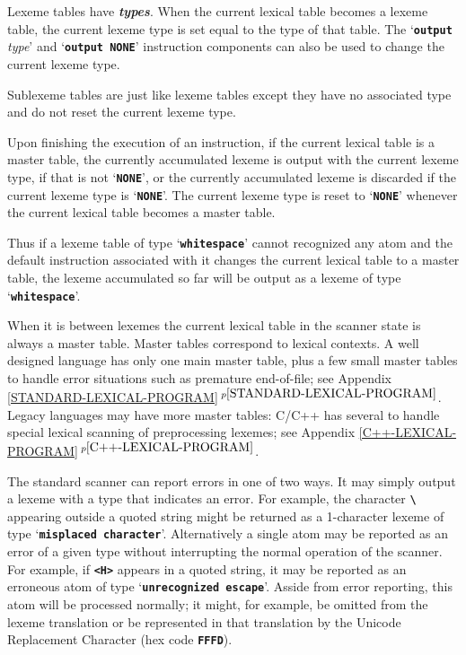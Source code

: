 \documentclass[12pt]{article}
\newcommand{\TT}[1]{{\tt \bfseries #1}}
\newcommand{\ikey}[2]{{\bf \em #1}\index{#2}}
\newcommand{\itemref}[1]{\ref{#1}$\,^{p\pageref{#1}}$}
\begin{document}
Lexeme tables have \ikey{types}{type!of lexeme table}.
When the current lexical table becomes a lexeme table,
the current lexeme type is set equal to the type of that table.
The `\TT{output} {\em type}' and `\TT{output NONE}'
instruction components can also be
used to change the current lexeme type.

Sublexeme tables are just like lexeme tables except they
have no associated type and do not reset the current lexeme type.

Upon finishing the execution of an instruction, if the
current lexical table is a master table,
the currently accumulated lexeme is output
with the current lexeme type, if that is not `\TT{NONE}', or the
currently accumulated lexeme is discarded if the current lexeme
type is `\TT{NONE}'.
The current lexeme type is reset to `\TT{NONE}' whenever
the current lexical table becomes a master table.

Thus if a lexeme table of
type `\TT{whitespace}' cannot recognized any atom and
the default instruction associated with it
changes the current lexical table to a master table,
the lexeme accumulated so far will
be output as a lexeme of type `\TT{whitespace}'.

When it is between lexemes the current lexical table in the scanner state
is always a master table.  Master tables correspond to lexical
contexts.  A well designed language has only one main master
table, plus a few small master tables to handle error situations
such as premature end-of-file;
see Appendix \itemref{STANDARD-LEXICAL-PROGRAM}.
Legacy languages
may have more master tables: C/C++ has several to handle
special lexical scanning of preprocessing lexemes;
see Appendix \itemref{C++-LEXICAL-PROGRAM}.

The standard scanner can report errors in one of two ways.  It may
simply output a lexeme with a type that indicates an error.  For
example, the character \TT{\textbackslash} appearing outside a quoted string
might be returned as a 1-character lexeme of type `\TT{misplaced
character}'.  Alternatively a single atom may be reported as an
error of a given type without interrupting the normal operation
of the scanner.  For example, if \TT{<H>} appears in a quoted
string, it may be reported as an erroneous atom of type
`\TT{unrecognized escape}'.  Asside from error reporting,
this atom will be processed
normally; it might, for example, be omitted from the lexeme
translation or be represented in that translation by the Unicode
Replacement Character (hex code \TT{FFFD}).
\end{document}
